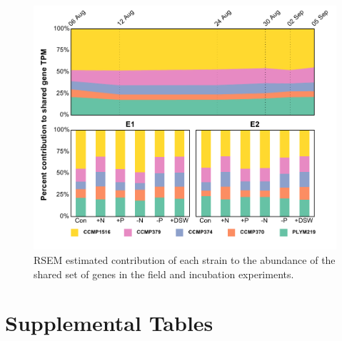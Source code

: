 \begin{figure}[p!]

  \centering
  \includegraphics[width=1\textwidth]{Images/C6_FigureS10_SharedGeneComp.pdf}
  \caption[RSEM estimated contribution of each strain to the abundance of the shared set of genes in the field and incubation experiments]{RSEM estimated contribution of each strain to the abundance of the shared set of genes in the field and incubation experiments.}
    \label{fig:a5f10}
\end{figure}
\clearpage

\section{Supplemental Tables}


